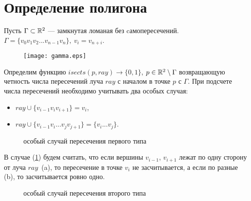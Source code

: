 \section{Определение полигона}

Пусть $\Gamma \subset \mathbb{R}^2$ --- замкнутая ломаная без cамопересечений. $\Gamma = \{v_0 v_1 v_2 ... v_{n-1} v_n \},
~v_i = v_{n + i}$.
\begin{figure}[h]
\texttt{[image: gamma.eps]}
\end{figure}
Определим функцию $isects(p, ray) \to \{0, 1\}$, $p \in \mathbb{R}^2 \setminus \Gamma$ возвращающую четность числа пересечений 
луча $ray$ с началом в точке $p$ с $\Gamma$. При подсчете числа пересечений необходимо учитывать два особых случая: 
\begin{itemize}
    \item $ray \cup \{v_{i-1}v_{i}v_{i+1}\} = v_i$, 
    \item $ray \cup \{v_{i-1}v_{i}...v_{j}v_{j+1}\} = \{v_{i}...v_{j}\}$. 
\end{itemize}

\begin{figure}[h]
\begin{minipage}[h]{0.49\linewidth}
\end{minipage}
\hfill
\begin{minipage}[h]{0.49\linewidth}
\end{minipage}
\caption{особый случай пересечения первого типа}
\label{pic:isect_1}
\end{figure}

В случае (\ref{pic:isect_1}) будем считать, что если вершины $v_{i-1}$, $v_{i+1}$ лежат по одну сторону от луча $ray$~(a), 
то пересечение в точке $v_i$ не засчитывается, а если по разные (b), то засчитывается ровно одно.

\begin{figure}[h]
\begin{minipage}[h]{0.49\linewidth}
\end{minipage}
\hfill
\begin{minipage}[h]{0.49\linewidth}
\end{minipage}
\caption{особый случай пересечения второго типа}
\label{pic:isect_2}
\end{figure}

